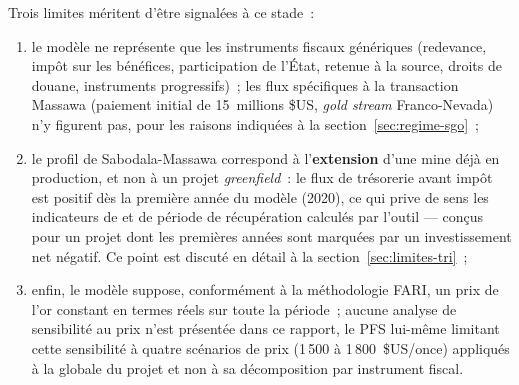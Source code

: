 Trois limites méritent d'être signalées à ce stade~:
\begin{enumerate}
  \item le modèle ne représente que les instruments fiscaux génériques (redevance, impôt sur les bénéfices, participation de l'État, retenue à la source, droits de douane, instruments progressifs)~; les flux spécifiques à la transaction Massawa (paiement initial de 15~millions \$US, \emph{gold stream} Franco-Nevada) n'y figurent pas, pour les raisons indiquées à la section~\ref{sec:regime-sgo}~;
  \item le profil de Sabodala-Massawa correspond à l'\textbf{extension} d'une mine déjà en production, et non à un projet \emph{greenfield}~: le flux de trésorerie avant impôt est positif dès la première année du modèle (2020), ce qui prive de sens les indicateurs de \TRI{} et de période de récupération calculés par l'outil --- conçus pour un projet dont les premières années sont marquées par un investissement net négatif. Ce point est discuté en détail à la section~\ref{sec:limites-tri}~;
  \item enfin, le modèle suppose, conformément à la méthodologie FARI, un prix de l'or constant en termes réels sur toute la période~; aucune analyse de sensibilité au prix n'est présentée dans ce rapport, le PFS lui-même limitant cette sensibilité à quatre scénarios de prix (1\,500 à 1\,800~\$US/once) appliqués à la \VAN{} globale du projet et non à sa décomposition par instrument fiscal.
\end{enumerate}
